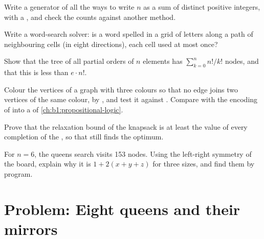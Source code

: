 \begin{exercise}[$\star\star$]\label{exo:b1:backtracking:7}
Write a generator of all the ways to write $n$ as a sum of distinct positive integers, with a , and check the
counts against another method.
\end{exercise}

\begin{exercise}[$\star\star$]\label{exo:b1:backtracking:8}
Write a word-search solver: is a word spelled in a grid of letters along a path of neighbouring cells (in eight
directions), each cell used at most once?
\end{exercise}

\begin{exercise}[$\star\star$]\label{exo:b1:backtracking:9}
Show that the tree of all partial orders of $n$ elements has $\sum_{k=0}^{n} n!/k!$ nodes, and that this is less than
$e \cdot n!$.
\end{exercise}

\begin{exercise}[$\star\star\star$]\label{exo:b1:backtracking:10}
Colour the vertices of a graph with three colours so that no edge joins two vertices of the same colour, by
, and test it against . Compare with the encoding of  into a  of
\cref{ch:b1:propositional-logic}.
\end{exercise}

\begin{exercise}[$\star\star\star$]\label{exo:b1:backtracking:11}
Prove that the relaxation bound of the knapsack is at least the value of every completion of the , so
that  still finds the optimum.
\end{exercise}

\begin{exercise}[$\star\star\star$]\label{exo:b1:backtracking:12}
For $n = 6$, the queens search visits 153 nodes. Using the left-right symmetry of the board, explain why it is $1 + 2(x
+ y + z)$ for three  sizes, and find them by program.
\end{exercise}

\section{Problem: Eight queens and their mirrors}\label{sec:b1:backtracking:problem}

